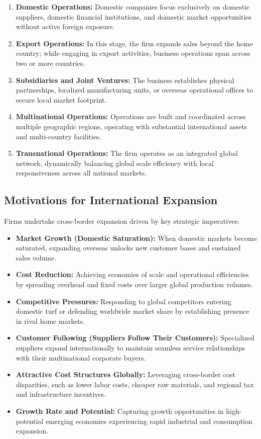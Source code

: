 \begin{enumerate}[leftmargin=*]
    \item \textbf{Domestic Operations:} Domestic companies focus exclusively on domestic suppliers, domestic financial institutions, and domestic market opportunities without active foreign exposure.
    \item \textbf{Export Operations:} In this stage, the firm expands sales beyond the home country; while engaging in export activities, business operations span across two or more countries.
    \item \textbf{Subsidiaries and Joint Ventures:} The business establishes physical partnerships, localized manufacturing units, or overseas operational offices to secure local market footprint.
    \item \textbf{Multinational Operations:} Operations are built and coordinated across multiple geographic regions, operating with substantial international assets and multi-country facilities.
    \item \textbf{Transnational Operations:} The firm operates as an integrated global network, dynamically balancing global scale efficiency with local responsiveness across all national markets.
\end{enumerate}

\newpage
\subsection{Motivations for International Expansion}
Firms undertake cross-border expansion driven by key strategic imperatives:
\begin{itemize}[leftmargin=*]
    \item \textbf{Market Growth (Domestic Saturation):} When domestic markets become saturated, expanding overseas unlocks new customer bases and sustained sales volume.
    \item \textbf{Cost Reduction:} Achieving economies of scale and operational efficiencies by spreading overhead and fixed costs over larger global production volumes.
    \item \textbf{Competitive Pressures:} Responding to global competitors entering domestic turf or defending worldwide market share by establishing presence in rival home markets.
    \item \textbf{Customer Following (Suppliers Follow Their Customers):} Specialized suppliers expand internationally to maintain seamless service relationships with their multinational corporate buyers.
    \item \textbf{Attractive Cost Structures Globally:} Leveraging cross-border cost disparities, such as lower labor costs, cheaper raw materials, and regional tax and infrastructure incentives.
    \item \textbf{Growth Rate and Potential:} Capturing growth opportunities in high-potential emerging economies experiencing rapid industrial and consumption expansion.
\end{itemize}

